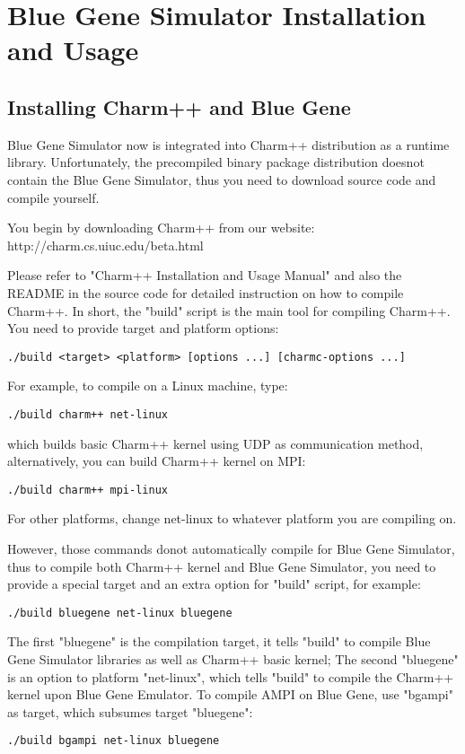 \section{Blue Gene Simulator Installation and Usage}
\label{install}

\subsection{Installing Charm++ and Blue Gene}

Blue Gene Simulator now is integrated into Charm++ distribution as a runtime 
library. Unfortunately, the precompiled binary package distribution doesnot 
contain the Blue Gene Simulator, thus you need to download source code
and compile yourself. 

You begin by downloading Charm++ from our website:
http://charm.cs.uiuc.edu/beta.html

Please refer to "Charm++ Installation and Usage Manual" and also the README
in the source code for detailed instruction on how to compile Charm++.
In short, the "build" script is the main tool for compiling Charm++.
You need to provide target and platform options:
\begin{verbatim}
./build <target> <platform> [options ...] [charmc-options ...]
\end{verbatim}

For example, to compile on a Linux machine, type:
\begin{verbatim}
./build charm++ net-linux
\end{verbatim}

which builds basic Charm++ kernel using UDP as communication method, 
alternatively, you can build Charm++ kernel on MPI:
\begin{verbatim}
./build charm++ mpi-linux
\end{verbatim}

For other platforms, change net-linux to whatever platform you are compiling 
on.

However, those commands donot automatically compile for Blue Gene Simulator, 
thus to compile both Charm++ kernel and Blue Gene Simulator, you need 
to provide a special target and an extra option for "build" script, 
for example:
\begin{verbatim}
./build bluegene net-linux bluegene
\end{verbatim}

The first "bluegene" is the compilation target, it tells "build" to
compile Blue Gene Simulator libraries as well as Charm++ basic kernel;
The second "bluegene" is an option to platform "net-linux", which tells
"build" to compile the Charm++ kernel upon Blue Gene Emulator. 
To compile AMPI on Blue Gene, use "bgampi" as target, which subsumes target
"bluegene":
\begin{verbatim}
./build bgampi net-linux bluegene
\end{verbatim}

